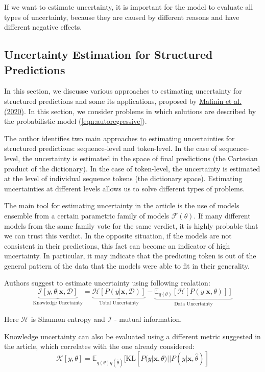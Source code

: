 \documentclass[a4paper,14pt]{extarticle}
\newcommand{\bibref}[3]{\hyperlink{#1}{#2 (#3)}}
\begin{document}
	If we want to estimate uncertainty, it is important for the model to evaluate all types of uncertainty, because they are caused by different reasons and have different negative effects.
	
	\subsection{Uncertainty Estimation for Structured Predictions}
	In this section, we discusse various approaches to estimating uncertainty for structured predictions and some its applications, proposed by \bibref{uncertainty}{Malinin et al.} {2020}. In this section, we consider problems in which solutions are described by the probabilistic model (\ref{eqn:autoregressive}).

	The author identifies two main approaches to estimating uncertainties for structured predictions: sequence-level and token-level. In the case of sequence-level, the uncertainty is estimated in the space of final predictions (the Cartesian product of the dictionary). In the case of token-level, the uncertainty is estimated at the level of individual sequence tokens (the dictionary space). Estimating uncertainties at different levels allows us to solve different types of problems.
	
	The main tool for estimating uncertainty in the article is the use of models ensemble from a certain parametric family of models $\mathcal{F}(\theta)$. If many different models from the same family vote for the same verdict, it is highly probable that we can trust this verdict. In the opposite situation, if the models are not consistent in their predictions, this fact can become an indicator of high uncertainty. In particular, it may indicate that the predicting token is out of the general pattern of the data that the models were able to fit in their generality.

	Authors suggest to estimate uncertainty using following realation:
	\begin{equation}
		\underbrace{\mathcal{I}[y, \theta|\textbf{x}, \mathcal{D}]}_\text{Knowledge Uncetainty}
		= 
		\underbrace{\mathcal{H}[P(y | \textbf{x}, \mathcal{D})]}_\text{Total Uncertainty}
		-
		\underbrace{\mathbb{E}_{q(\theta)}[\mathcal{H}[P(y| \textbf{x}, \theta)]]}_\text{Data Uncertainty}
	\end{equation}
	
	Here $\mathcal{H}$ is Shannon entropy and $\mathcal{I}$ - mutual information.
	
	Knowledge uncertainty can also be evaluated using a different metric suggested in the article, which correlates with the one already considered:
	\begin{equation}
		\mathcal{K}[y, \theta] = \mathbb{E}_{q(\theta)q(\hat{\theta})}[
			\mathrm{KL}[P(y|\textbf{x}, \theta) || P(y|\textbf{x}, \hat{\theta})
		]
	\end{equation}
\end{document}
